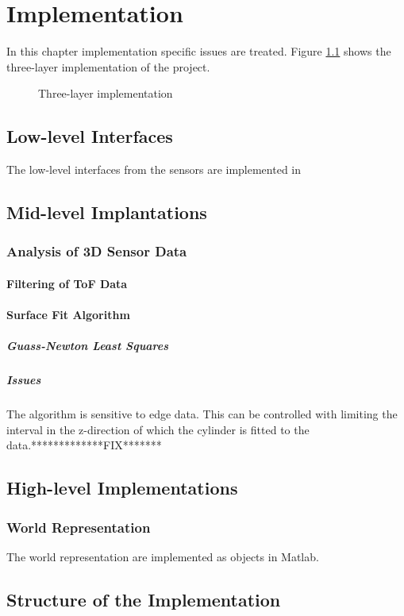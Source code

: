 
\chapter{Implementation}
In this chapter implementation specific issues are treated. Figure
\ref{chap6:fig-implementation} shows the three-layer implementation of the project.
\begin{figure}[htbp]
    \centering
    \caption{Three-layer implementation}
    \label{chap6:fig-implementation}
\end{figure}


\section{Low-level Interfaces}
The low-level interfaces from the sensors are implemented in 


\section{Mid-level Implantations}

\subsection{Analysis of 3D Sensor Data}

\subsubsection{Filtering of ToF Data}


\subsubsection{Surface Fit Algorithm}


\paragraph{Guass-Newton Least Squares}


\paragraph{Issues}
The algorithm is sensitive to edge data. This can be controlled with limiting the interval
in the z-direction of which the cylinder is fitted to the data.*************FIX*******


\section{High-level Implementations}

\subsection{World Representation}
The world representation are implemented as objects in Matlab.



\section{Structure of the Implementation}


